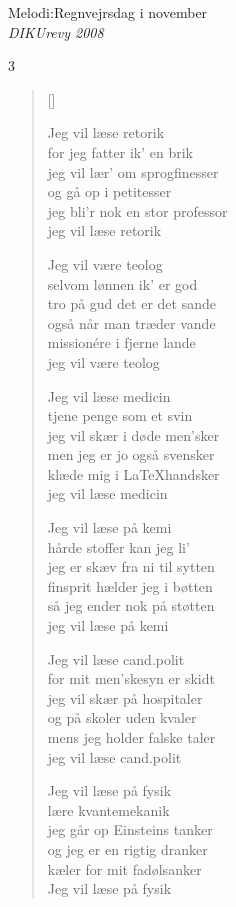 {Melodi:Regnvejrsdag i november}\\[.2em]
{\small\itshape DIKUrevy 2008}
\begin{multicols}3
\settowidth{\versewidth}{[C]jeg bli'r nok en [Am]stor professor}
\begin{verse}[\versewidth]

Jeg vil læse retorik\\
for jeg fatter ik' en brik\\
jeg vil lær' om sprogfinesser\\
og gå op i petitesser\\
jeg bli'r nok en stor professor\\
jeg vil læse retorik

Jeg vil være teolog\\
selvom lønnen ik' er god\\
tro på gud det er det sande\\
også når man træder vande\\
missionére i fjerne lande\\
jeg vil være teolog

Jeg vil læse medicin\\
tjene penge som et svin\\
jeg vil skær i døde men'sker\\
men jeg er jo også svensker\\
klæde mig i \LaTeX handsker\\
jeg vil læse medicin


Jeg vil læse på kemi\\
hårde stoffer kan jeg li'\\
jeg er skæv fra ni til sytten\\
finsprit hælder jeg i bøtten\\
så jeg ender nok på støtten\\
jeg vil læse på kemi


Jeg vil læse cand.polit\\
for mit men'skesyn er skidt\\
jeg vil skær på hospitaler\\
og på skoler uden kvaler\\
mens jeg holder falske taler\\
jeg vil læse cand.polit


Jeg vil læse på fysik\\
lære kvantemekanik\\
jeg går op Einsteins tanker\\
og jeg er en rigtig dranker\\
kæler for mit fadølsanker\\
Jeg vil læse på fysik



\end{verse}
\end{multicols}
